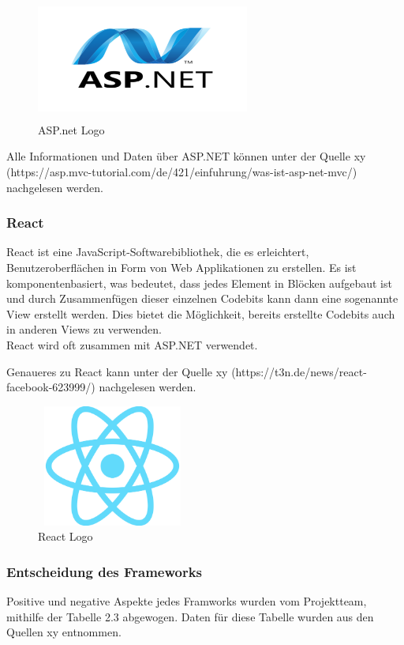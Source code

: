 \begin{figure}[h]
	\centering
	\includegraphics[height=4cm,width=7cm]{images/ASP.net_Logo}
	\caption{ASP.net Logo}
	\label{fig:ASP.net Logo}
\end{figure}


Alle Informationen und Daten über ASP.NET können unter der Quelle xy (https://asp.mvc-tutorial.com/de/421/einfuhrung/was-ist-asp-net-mvc/) nachgelesen werden.

\subsubsection{React}
React ist eine JavaScript-Softwarebibliothek, die es erleichtert, Benutzeroberflächen in Form von Web Applikationen zu erstellen. Es ist komponentenbasiert, was bedeutet, dass jedes Element in Blöcken aufgebaut ist und durch Zusammenfügen dieser einzelnen Codebits kann dann eine sogenannte View erstellt werden. Dies bietet die Möglichkeit, bereits erstellte Codebits auch in anderen Views zu verwenden.\\ React wird oft zusammen mit ASP.NET verwendet.


Genaueres zu React kann unter der Quelle xy (https://t3n.de/news/react-facebook-623999/) nachgelesen werden.
\begin{figure}[h]
	\centering
	\includegraphics[height=4cm,width=5cm]{images/React_Logo}
	\caption{React Logo}
	\label{fig:React Logo}
\end{figure}
\newpage

\subsubsection{Entscheidung des Frameworks}\label{sec:Entscheidung des Frameworks}
Positive und negative Aspekte jedes Framworks wurden vom Projektteam, mithilfe der Tabelle 2.3 abgewogen. Daten für diese Tabelle wurden aus den Quellen xy entnommen.


